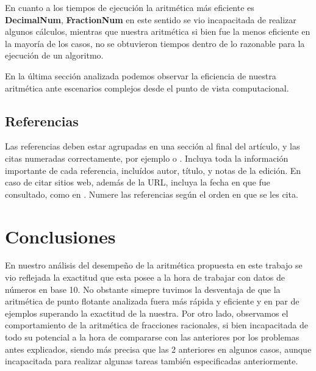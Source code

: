 \documentclass[a4paper,10pt,twocolumn]{article}
\begin{document}
	En cuanto a los tiempos de ejecución la aritmética más eficiente es \textbf{DecimalNum}, \textbf{FractionNum} en este sentido se vio incapacitada de realizar algunos cálculos, mientras que nuestra aritmética si bien fue la menos eficiente en la mayoría de los casos, no se obtuvieron tiempos dentro de lo razonable para la ejecución de un algoritmo.
	
	En la última sección analizada podemos observar la eficiencia de nuestra aritmética ante escenarios complejos desde el punto de vista computacional.


	

	\subsection{Referencias}
  	Las referencias deben estar agrupadas en una sección al final del artículo,
  	y las citas numeradas correctamente, por ejemplo \cite{knuth} o \cite{goedel}.
  	Incluya toda la información importante de cada referencia, incluídos autor,
  	título, y notas de la edición. En caso de citar sitios web, además
  	de la URL, incluya la fecha en que fue consultado, como en \cite{wiki}. Numere 
  	las referencias según el orden en que se les cita.




\section{Conclusiones}\label{sec:conc}

  En nuestro análisis del desempeño de la aritmética propuesta en este trabajo se vio reflejada la exactitud que esta posee a la hora de trabajar con datos de números en base 10. No obstante simepre tuvimos la desventaja de que la aritmética de punto flotante analizada fuera más rápida y eficiente y en par de ejemplos superando la exactitud de la nuestra. Por otro lado, observamos el comportamiento de la aritmética de fracciones racionales, si bien incapacitada de todo su potencial a la hora de compararse con las anteriores por los problemas antes explicados, siendo más precisa que las 2 anteriores en algunos casos, aunque incapacitada para realizar algunas tareas también especificadas anteriormente.
  
\end{document}
